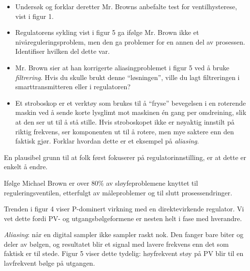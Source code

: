 \begin{itemize}
\item{} Undersøk og forklar deretter Mr. Browns anbefalte test for ventilhysterese, vist i figur 1.
\item{} Regulatorens sykling vist i figur 5 ga ifølge Mr. Brown ikke et nivåreguleringsproblem, men den ga problemer for en annen del av prosessen. Identifiser hvilken del dette var.
\item{} Mr. Brown sier at han korrigerte aliasingproblemet i figur 5 ved å bruke {\it filtrering}. Hvis du skulle brukt denne ``løsningen'', ville du lagt filtreringen i smarttransmitteren eller i regulatoren?
\item{} Et stroboskop er et verktøy som brukes til å ``fryse'' bevegelsen i en roterende maskin ved å sende korte lysglimt mot maskinen én gang per omdreining, slik at den ser ut til å stå stille. Hvis stroboskopet ikke er nøyaktig innstilt på riktig frekvens, ser komponenten ut til å rotere, men mye saktere enn den faktisk gjør. Forklar hvordan dette er et eksempel på {\it aliasing}.
\end{itemize}














En plausibel grunn til at folk først fokuserer på regulatorinnstilling, er at dette er enkelt å endre.

\vskip 10pt

Ifølge Michael Brown er over 80\% av sløyfeproblemene knyttet til reguleringsventilen, etterfulgt av måleproblemer og til slutt prosessendringer.

\vskip 10pt

Trenden i figur 4 viser P-dominert virkning med en direktevirkende regulator. Vi vet dette fordi PV- og utgangsbølgeformene er nesten helt i fase med hverandre.

\vskip 10pt

{\it Aliasing}: når en digital sampler ikke sampler raskt nok. Den fanger bare biter og deler av bølgen, og resultatet blir et signal med lavere frekvens enn det som faktisk er til stede. Figur 5 viser dette tydelig: høyfrekvent støy på PV blir til en lavfrekvent bølge på utgangen.

